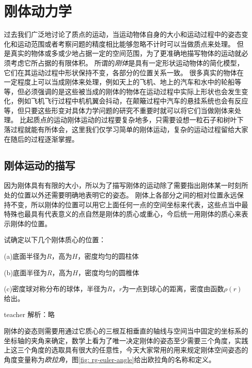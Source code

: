 
\chapter{刚体动力学}
过去我们广泛地讨论了质点的运动，当运动物体自身的大小和运动过程中的姿态变化和运动范围或者考察问题的精度相比能够忽略不计时可以当做质点来处理。
但是真实的物体或多或少地占据一定的空间范围，为了更准确地描写物体的运动就必须考虑它所占据的有限体积。
所谓的\emph{刚体}是具有一定形状运动物体的简化模型，它们在其运动过程中形状保持不变，各部分的位置关系一致。
很多真实的物体在一定程度上可以当成刚体来处理，例如天上的飞机、地上的汽车和水中的轮船等等，但必须强调的是这些被当成的刚体的物体在运动过程中实际上形状也会发生变化，例如飞机飞行过程中机机翼会抖动，在颠簸过程中汽车的悬挂系统也会有反应等，但只要这些形变对具体力学问题的研究不重要时就可以将它们当做刚体来处理。
比起质点的运动刚体运动的过程要复杂地多，只需要设想一粒石子和树叶下落过程就能有所体会，这里我们仅学习简单的刚体运动，复杂的运动过程留给大家在随后的过程逐渐掌握。

\section{刚体运动的描写}
因为刚体具有有限的大小，所以为了描写刚体的运动除了需要指出刚体某一时刻所处的位置以外还需要明确地表明它的姿态。
刚体上各部分之间的相对位置永远保持不变，所以刚体的位置可以用它上面任何一点的空间坐标来代表，这些点当中最特殊也最具有代表意义的点自然是刚体的质心或重心，今后统一用刚体的质心来表示刚体的位置。

\begin{example}
试确定以下几个刚体质心的位置：



(a)底面半径为$R$，高为$H$，密度均匀的圆柱体

(b)底面半径为$R$，高为$H$，密度均匀的圆椎体

(c)密度球对称分布的球体，半径为$R$，$r$为一点到球心的距离，密度由函数$\rho(r)$给出。


\begin{taggedblock}{teacher}
\noindent
解析：略
\end{taggedblock}
\end{example}
刚体的姿态则需要用通过它质心的三根互相垂直的轴线与空间当中固定的坐标系的坐标轴的夹角来确定，数学上看为了唯一决定刚体的姿态至少需要三个角度，实践上这三个角度的选取具有很大的任意性，今天大家常用的用来规定刚体空间姿态的角度变量称为\emph{欧拉角}，图\ref{fig: rg-euler-angle}给出欧拉角的名称和定义。

